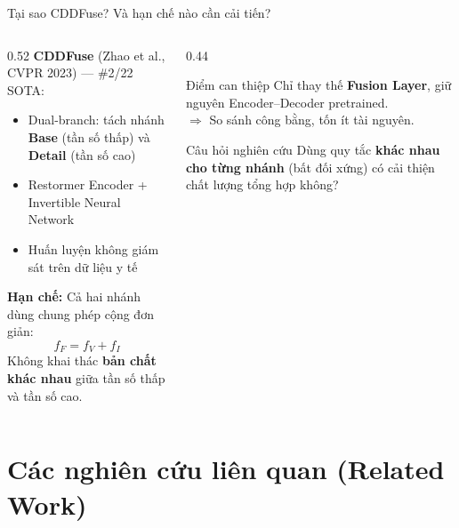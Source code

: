 \documentclass[t, aspectratio=169]{beamer}
\begin{document}
\begin{frame}{Tại sao CDDFuse? Và hạn chế nào cần cải tiến?}
    \begin{columns}[T]
        \begin{column}{0.52\textwidth}
            \textbf{CDDFuse} (Zhao et al., CVPR 2023) --- \#2/22 SOTA:
            \begin{itemize}
                \item Dual-branch: tách nhánh \textbf{Base} (tần số thấp) và \textbf{Detail} (tần số cao)
                \item Restormer Encoder + Invertible Neural Network
                \item Huấn luyện không giám sát trên dữ liệu y tế
            \end{itemize}
            \vspace{0.3em}
            \textbf{Hạn chế:} Cả hai nhánh dùng chung \alert{phép cộng đơn giản}:
            \[ f_F = f_V + f_I \]
            Không khai thác \textbf{bản chất khác nhau} giữa tần số thấp và tần số cao.
        \end{column}
        \begin{column}{0.44\textwidth}
            \begin{alertblock}{Điểm can thiệp}
                Chỉ thay thế \textbf{Fusion Layer}, giữ nguyên Encoder--Decoder pretrained.\\[4pt]
                $\Rightarrow$ So sánh công bằng, tốn ít tài nguyên.
            \end{alertblock}
            \vspace{0.5em}
            \begin{block}{Câu hỏi nghiên cứu}
                \small Dùng quy tắc \textbf{khác nhau cho từng nhánh} (bất đối xứng) có cải thiện chất lượng tổng hợp không?
            \end{block}
        \end{column}
    \end{columns}
\end{frame}

\section{Các nghiên cứu liên quan (Related Work)}
\useStyleHustFull
\useThinBar
\end{document}
